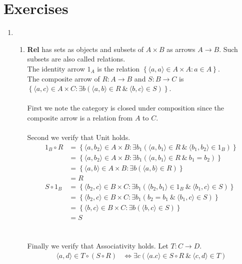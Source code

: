 \documentclass{article} %
\newcommand{\set}[1]{\left\{#1\right\}}
\newcommand{\pair}[1]{\langle#1\rangle}
\begin{document}
\section*{Exercises}
\begin{enumerate}
	\item \begin{enumerate}
        \item \textbf{Rel} has sets as objects and subsets of $A\times B$ as arrows $A\rightarrow B$. Such subsets are also called relations.
        \\The identity arrow $1_A$ is the relation $\set{\pair{a,a}\in A\times A:a\in A}$.
        \\The composite arrow of $R:A\rightarrow B$ and $S:B\rightarrow C$ is $\set{\pair{a,c}\in A\times C:\exists b(\pair{a,b}\in R\:\&\:\pair{b,c}\in S)}$.
        \\
        \\First we note the category is closed under composition since the composite arrow is a relation from $A$ to $C$.
        \\
        \\Second we verify that Unit holds.
        \begin{align*}
            1_B \circ R &= \set{ \pair{a,b_2} \in A \times B : \exists b_1 (\pair{a,b_1} \in R \:\&\: \pair{b_1,b_2} \in 1_B)}
            \\&=\set{ \pair{a,b_2} \in A \times B : \exists b_1 (\pair{a,b_1} \in R \:\&\: b_1=b_2)}
            \\&=\set{ \pair{a,b} \in A \times B : \exists b (\pair{a,b} \in R)}
            \\&=R
            \\S \circ 1_B &= \set{ \pair{b_2,c} \in B \times C : \exists b_1 (\pair{b_2,b_1} \in 1_B \:\&\: \pair{b_1,c} \in S)}
            \\&=\set{ \pair{b_2,c} \in B \times C : \exists b_1 (b_2=b_1 \:\&\: \pair{b_1,c} \in S)}
            \\&=\set{ \pair{b,c} \in B \times C : \exists b (\pair{b,c} \in S)}
            \\&=S
        \end{align*}
        \\
        \\Finally we verify that Associativity holds. Let $T:C\rightarrow D$.
        \begin{align*}
            \pair{a,d}\in T\circ (S\circ R) &\iff \exists c(\pair{a.c}\in S\circ R \:\&\: \pair{c,d}\in T)

\end{align*}
\end{enumerate}
\end{enumerate}
\end{document}
